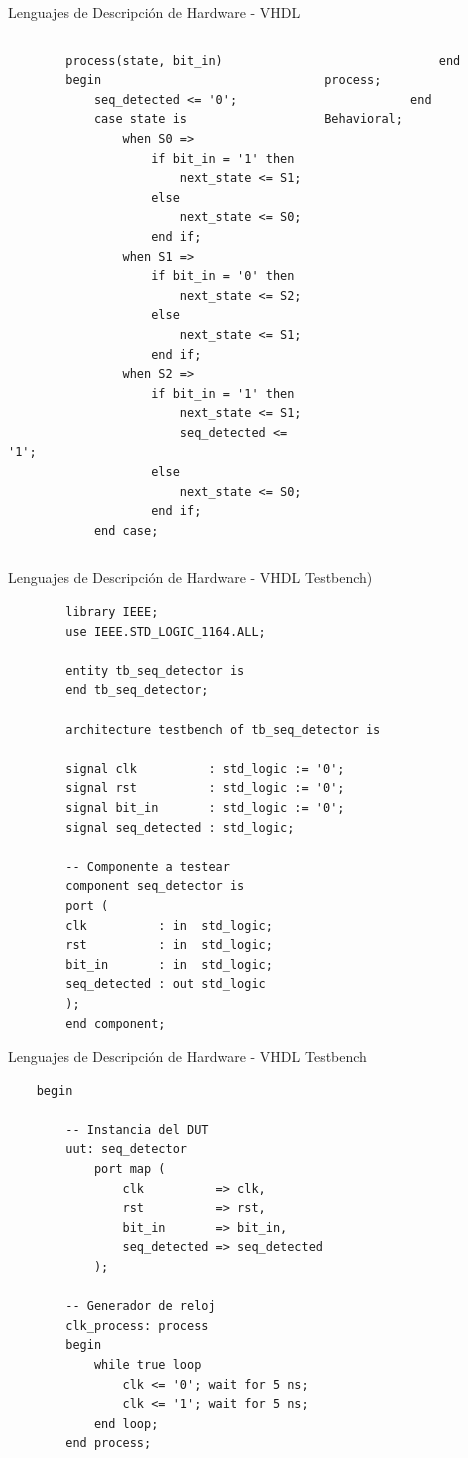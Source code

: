 \documentclass[11pt]{beamer}
\begin{document}
	\begin{frame}[fragile]{Lenguajes de Descripción de Hardware - VHDL}
	\begin{columns}[t]
	\begin{lstlisting}
		process(state, bit_in)
		begin
			seq_detected <= '0';
			case state is
				when S0 =>
					if bit_in = '1' then
						next_state <= S1;
					else
						next_state <= S0;
					end if;
				when S1 =>
					if bit_in = '0' then
						next_state <= S2;
					else
						next_state <= S1;
					end if;
				when S2 =>
					if bit_in = '1' then
						next_state <= S1;
						seq_detected <= '1';
					else
						next_state <= S0;
					end if;
			end case;
	\end{lstlisting}	
		
	\begin{lstlisting}	
				end process;
			end Behavioral;
	\end{lstlisting}
	\end{columns}
	\end{frame}
	
	\begin{frame}[fragile]{Lenguajes de Descripción de Hardware - VHDL Testbench)}
	\begin{lstlisting}
		library IEEE;
		use IEEE.STD_LOGIC_1164.ALL;
		
		entity tb_seq_detector is
		end tb_seq_detector;
		
		architecture testbench of tb_seq_detector is
		
		signal clk          : std_logic := '0';
		signal rst          : std_logic := '0';
		signal bit_in       : std_logic := '0';
		signal seq_detected : std_logic;
		
		-- Componente a testear
		component seq_detector is
		port (
		clk          : in  std_logic;
		rst          : in  std_logic;
		bit_in       : in  std_logic;
		seq_detected : out std_logic
		);
		end component;
	\end{lstlisting}
	\end{frame}

	\begin{frame}[fragile]{Lenguajes de Descripción de Hardware - VHDL Testbench}
	\begin{lstlisting}
	begin
	
		-- Instancia del DUT
		uut: seq_detector
			port map (
				clk          => clk,
				rst          => rst,
				bit_in       => bit_in,
				seq_detected => seq_detected
			);
			
		-- Generador de reloj 
		clk_process: process
		begin
			while true loop
				clk <= '0'; wait for 5 ns;
				clk <= '1'; wait for 5 ns;
			end loop;
		end process;
		\end{lstlisting}
	\end{frame}
\end{document}
